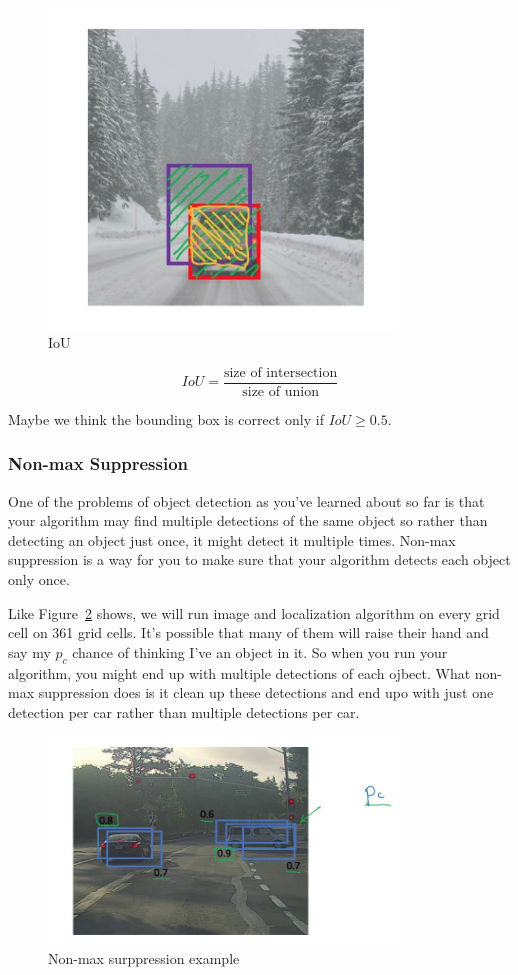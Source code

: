 \documentclass[UTF8]{article}
\begin{document}
\begin{figure}[htb]
    \centering
    \includegraphics[width=25em]{figures/IoU}
    \caption{IoU}
    \label{fig:IoU}
\end{figure}

$$ IoU = \frac{\text{size of intersection}}{\text{size of union}} $$

Maybe we think the bounding box is correct only if $IoU \geq 0.5$.

\subsubsection{Non-max Suppression}
One of the problems of object detection as you've learned about so far is that your algorithm may
find multiple detections of the same object so rather than detecting an object just once, it might
detect it multiple times. Non-max suppression is a way for you to make sure that your algorithm
detects each object only once.

Like Figure~\ref{fig:non-max-surppression-example} shows, we will run image and localization
algorithm on every grid cell on 361 grid cells. It's possible that many of them will raise their
hand and say my $p_c$ chance of thinking I've an object in it. So when you run your algorithm, you
might end up with multiple detections of each ojbect. What non-max suppression does is it clean up
these detections and end upo with just one detection per car rather than multiple detections per
car.

\begin{figure}[htb]
    \centering
    \includegraphics[width=25em]{figures/non-max-surppression-example}
    \caption{Non-max surppression example}
    \label{fig:non-max-surppression-example}
\end{figure}
\end{document}
